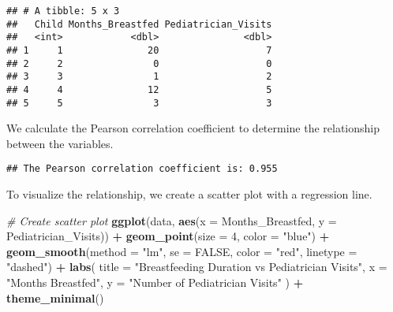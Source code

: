 \documentclass[
]{article}
\newenvironment{Shaded}{\begin{snugshade}}{\end{snugshade}}
\newcommand{\AttributeTok}[1]{\textcolor[rgb]{0.13,0.29,0.53}{#1}}
\newcommand{\CommentTok}[1]{\textcolor[rgb]{0.56,0.35,0.01}{\textit{#1}}}
\newcommand{\ConstantTok}[1]{\textcolor[rgb]{0.56,0.35,0.01}{#1}}
\newcommand{\DecValTok}[1]{\textcolor[rgb]{0.00,0.00,0.81}{#1}}
\newcommand{\FunctionTok}[1]{\textcolor[rgb]{0.13,0.29,0.53}{\textbf{#1}}}
\newcommand{\NormalTok}[1]{#1}
\newcommand{\OtherTok}[1]{\textcolor[rgb]{0.56,0.35,0.01}{#1}}
\newcommand{\SpecialCharTok}[1]{\textcolor[rgb]{0.81,0.36,0.00}{\textbf{#1}}}
\newcommand{\StringTok}[1]{\textcolor[rgb]{0.31,0.60,0.02}{#1}}
\begin{document}
\begin{verbatim}
## # A tibble: 5 x 3
##   Child Months_Breastfed Pediatrician_Visits
##   <int>            <dbl>               <dbl>
## 1     1               20                   7
## 2     2                0                   0
## 3     3                1                   2
## 4     4               12                   5
## 5     5                3                   3
\end{verbatim}

We calculate the Pearson correlation coefficient to determine the
relationship between the variables.

\begin{Shaded}
\end{Shaded}

\begin{verbatim}
## The Pearson correlation coefficient is: 0.955
\end{verbatim}

To visualize the relationship, we create a scatter plot with a
regression line.

\begin{Shaded}
\begin{Highlighting}[]
\CommentTok{\# Create scatter plot}
\FunctionTok{ggplot}\NormalTok{(data, }\FunctionTok{aes}\NormalTok{(}\AttributeTok{x =}\NormalTok{ Months\_Breastfed, }\AttributeTok{y =}\NormalTok{ Pediatrician\_Visits)) }\SpecialCharTok{+}
  \FunctionTok{geom\_point}\NormalTok{(}\AttributeTok{size =} \DecValTok{4}\NormalTok{, }\AttributeTok{color =} \StringTok{"blue"}\NormalTok{) }\SpecialCharTok{+}
  \FunctionTok{geom\_smooth}\NormalTok{(}\AttributeTok{method =} \StringTok{"lm"}\NormalTok{, }\AttributeTok{se =} \ConstantTok{FALSE}\NormalTok{, }\AttributeTok{color =} \StringTok{"red"}\NormalTok{, }\AttributeTok{linetype =} \StringTok{"dashed"}\NormalTok{) }\SpecialCharTok{+}
  \FunctionTok{labs}\NormalTok{(}
    \AttributeTok{title =} \StringTok{"Breastfeeding Duration vs Pediatrician Visits"}\NormalTok{,}
    \AttributeTok{x =} \StringTok{"Months Breastfed"}\NormalTok{,}
    \AttributeTok{y =} \StringTok{"Number of Pediatrician Visits"}
\NormalTok{  ) }\SpecialCharTok{+}
  \FunctionTok{theme\_minimal}\NormalTok{()}
\end{Highlighting}
\end{Shaded}
\end{document}
